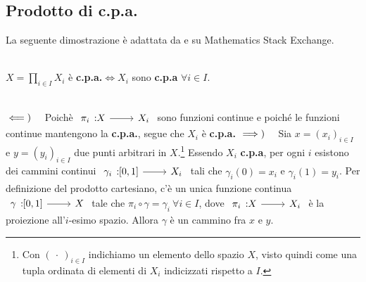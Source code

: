 \subsection{Prodotto di c.p.a.}
La seguente dimostrazione è adattata da \cite{hagen:productCPA} e \cite{scott:CPAfromproduct} su Mathematics Stack Exchange.
\begin{lemming}~{}\label{prodottocpa}\\
	$\displaystyle X=\prod_{i\in I}X_i$ è \textbf{c.p.a.}$\iff X_i$ sono \textbf{c.p.a} $\forall i\in I$.
\end{lemming}
\begin{demonstration}~{}\\
	$\impliedby)\quad$ Poichè $\funz{\pi_i}{X}{X_i}$ sono funzioni continue e poiché le funzioni continue mantengono la \textbf{c.p.a.}, segue che $X_i$ è \textbf{c.p.a.}
	$\implies)\quad$ Sia $x=\left(x_i\right)_{i\in I}$ e $y=\left(y_i\right)_{i\in I}$ due punti arbitrari in $X$.\footnote{Con $\left(\ \cdot\ \right)_{i\in I}$ indichiamo un elemento dello spazio $X$, visto quindi come una tupla ordinata di elementi di $X_i$ indicizzati rispetto a $I$.} Essendo $X_i$ \textbf{c.p.a}, per ogni $i$ esistono dei cammini continui $\funz{\gamma_i}{\left[0, 1\right]}{X_i}$ tali che $\gamma_i\left(0\right)=x_i$ e $\gamma_i\left(1\right)=y_i$. Per definizione del prodotto cartesiano, c'è un unica funzione continua $\funz{\gamma}{\left[0, 1\right]}{X}$ tale che $\pi_i\circ\gamma=\gamma_i\ \forall i\in I$, dove $\funz{\pi_i}{X}{X_i}$ è la proiezione all'$i$-esimo spazio. Allora $\gamma$ è un cammino fra $x$ e $y$.\\
\end{demonstration}
